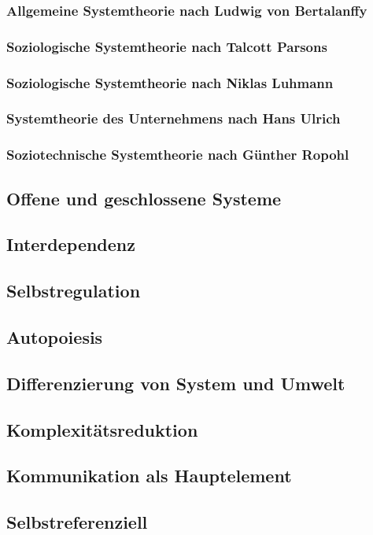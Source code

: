 \documentclass[a4paper,12pt]{article}
\begin{document}
\subsubsection{Allgemeine Systemtheorie nach Ludwig von Bertalanffy}
\subsubsection{Soziologische Systemtheorie nach Talcott Parsons}
\subsubsection{Soziologische Systemtheorie nach Niklas Luhmann}
\subsubsection{Systemtheorie des Unternehmens nach Hans Ulrich}
\subsubsection{Soziotechnische Systemtheorie nach Günther Ropohl}

\subsection{Offene und geschlossene Systeme}
\subsection{Interdependenz}
\subsection{Selbstregulation}
\subsection{Autopoiesis}
\subsection{Differenzierung von System und Umwelt}
\subsection{Komplexitätsreduktion}
\subsection{Kommunikation als Hauptelement}
\subsection{Selbstreferenziell}
\end{document}
